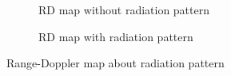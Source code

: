 \documentclass[12pt,DIV14,BCOR12mm,a4paper,footinclude=false,headinclude,parskip=half-,twoside,openright,cleardoublepage=empty,toc=index,bibliography=totoc,listof=totoc]{scrreprt}
\numberwithin{equation}{chapter}
\begin{document}
\begin{figure}[t]
    \centering
    \begin{subfigure}{0.45\textwidth}
        \centering
        \caption{RD map without radiation pattern}
    \end{subfigure}\hspace{0.5cm}
    \begin{subfigure}{0.45\textwidth}
        \centering
        \caption{RD map with radiation pattern}
    \end{subfigure}
    \caption{Range-Doppler map about radiation pattern}
    \label{range doppler map about radiation pattern}
\end{figure}
\end{document}
